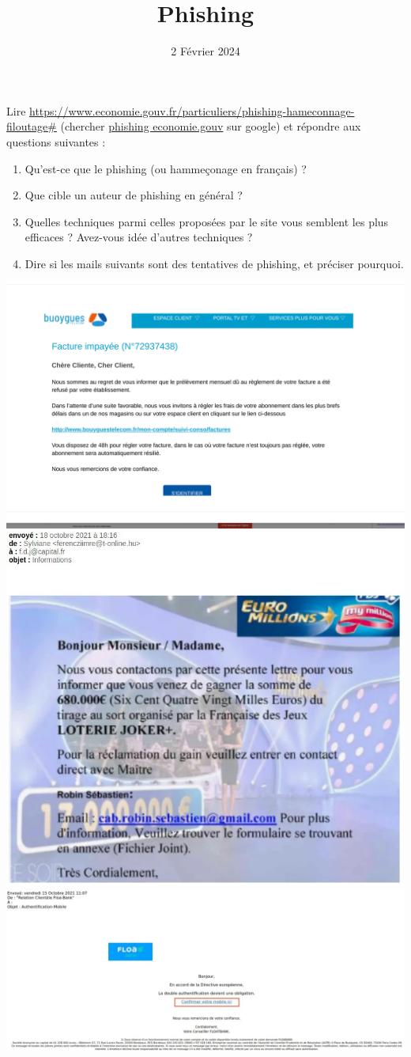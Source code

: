 \documentclass{article}
\title{Phishing}
\author{}
\date{2 Février 2024}
\begin{document}
\maketitle

Lire \url{https://www.economie.gouv.fr/particuliers/phishing-hameconnage-filoutage#} (chercher \url{phishing economie.gouv} sur google) et répondre aux questions suivantes :
\begin{enumerate}
\item Qu'est-ce que le phishing (ou hammeçonage en français) ?
\item Que cible un auteur de phishing en général ?
\item Quelles techniques parmi celles proposées par le site vous semblent les plus efficaces ? Avez-vous idée d'autres techniques ?
\item Dire si les mails suivants sont des tentatives de phishing, et préciser pourquoi.
\end{enumerate}

\begin{center}
\includegraphics[width=\textwidth]{buoygues.png}
\includegraphics[width=\textwidth]{loto.png}
\includegraphics[width=\textwidth]{float.png}
\end{center}
\end{document}

